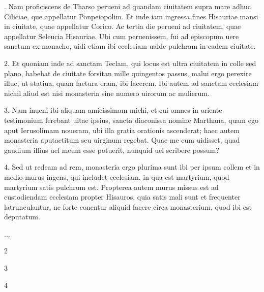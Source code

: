 \documentclass[a5paper]{article}
\begin{document}
\setlength{\columnrulewidth}{0.5pt}
\setlength{\Lcolwidth}{0.425\textwidth}
\setlength{\Rcolwidth}{0.425\textwidth}

\begin{pages}
\begin{Leftside}
\beginnumbering
\autopar
{}\itshape

. Nam proficiscens de Tharso perueni ad quandam ciuitatem supra mare adhuc Ciliciae, que appellatur Ponpeiopolim. Et inde iam ingressa fines Hisauriae mansi in ciuitate, quae appellatur Corico. Ac tertia die perueni ad ciuitatem, quae appellatur Seleucia Hisauriae. Ubi cum peruenissem, fui ad episcopum uere sanctum ex monacho, uidi etiam ibi ecclesiam ualde pulchram in eadem ciuitate.
\pend

\autopar

2. Et quoniam inde ad sanctam Teclam, qui locus est ultra ciuitatem in colle sed plano, habebat de ciuitate forsitan mille quingentos passus, malui ergo perexire illuc, ut statiua, quam factura eram, ibi facerem. Ibi autem ad sanctam ecclesiam nichil aliud est nisi monasteria sine numero uirorum ac mulierum.

3. Nam inueni ibi aliquam amicissimam michi, et cui omnes in oriente testimonium ferebant uitae ipsius, sancta diaconissa nomine Marthana, quam ego aput Ierusolimam noueram, ubi illa gratia orationis ascenderat; haec autem monasteria aputactitum seu uirginum regebat. Quae me cum uidisset, quad gaudium illius uel meum esse potuerit, nunquid uel scribere possum?

4. Sed ut redeam ad rem, monasteria ergo plurima sunt ibi per ipsum collem et in medio murus ingens, qui includet ecclesiam, in qua est martyrium, quod martyrium satis pulchrum est. Propterea autem murus missus est ad custodiendam ecclesiam propter Hisauros, quia satis mali sunt et frequenter latrunculantur, ne forte conentur aliquid facere circa monasterium, quod ibi est deputatum.

\endnumbering
\end{Leftside}

\begin{Rightside}
\beginnumbering

...
\pend

\autopar

2

3

4

\endnumbering
\end{Rightside}
\end{pages}

\Pages
\end{document}
